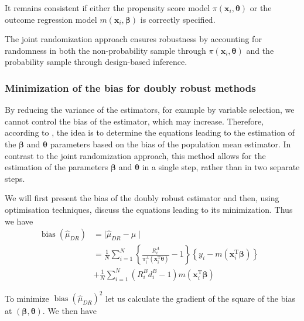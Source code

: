 \documentclass[
]{jss}
\begin{document}
It remains consistent if either the propensity score model
\(\pi(\boldsymbol{x}_i, \boldsymbol{\theta})\) or the outcome regression
model \(m(\boldsymbol{x}_i, \boldsymbol{\beta})\) is correctly
specified.

The joint randomization approach ensures robustness by accounting for
randomness in both the non-probability sample through
\(\pi(\boldsymbol{x}_i, \boldsymbol{\theta})\) and the probability
sample through design-based inference.

\hypertarget{minimization-of-the-bias-for-doubly-robust-methods}{%
\subsubsection{Minimization of the bias for doubly robust
methods}\label{minimization-of-the-bias-for-doubly-robust-methods}}

By reducing the variance of the estimators, for example by variable
selection, we cannot control the bias of the estimator, which may
increase. Therefore, according to \citet{yang_doubly_2020}, the idea is
to determine the equations leading to the estimation of the
\(\boldsymbol{\beta}\) and \(\boldsymbol{\theta}\) parameters based on
the bias of the population mean estimator. In contrast to the joint
randomization approach, this method allows for the estimation of the
parameters \(\boldsymbol{\beta}\) and \(\boldsymbol{\theta}\) in a
single step, rather than in two separate steps.

We will first present the bias of the doubly robust estimator and then,
using optimisation techniques, discuss the equations leading to its
minimization. Thus we have \begin{equation}
\begin{aligned}
\operatorname{bias}\left(\hat{\mu}_{D R}\right) & = \mid\hat{\mu}_{DR}-\mu\mid& \\
& =\frac{1}{N} \sum_{i=1}^N\left\{\frac{R_i^A}{\pi_i^A\left(\boldsymbol{x}_i^{\mathrm{T}} \boldsymbol{\theta}\right)}-1\right\}\left\{y_i-m\left(\boldsymbol{x}_i^{\mathrm{T}} \boldsymbol{\beta}\right)\right\}\\
& + \frac{1}{N} \sum_{i=1}^N\left(R_i^B d_i^B-1\right) m\left(\boldsymbol{x}_i^{\mathrm{T}} \boldsymbol{\beta}\right)
\end{aligned}
\end{equation}

To minimize \(\operatorname{bias}\left(\hat{\mu}_{D R}\right)^2\) let us
calculate the gradient of the square of the bias at
\(\left(\boldsymbol{\beta}, \boldsymbol{\theta}\right)\). We then have
\end{document}

